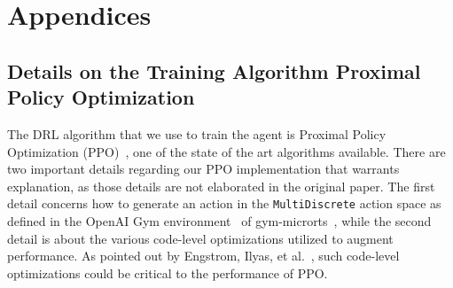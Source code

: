 \documentclass[letterpaper]{article}
\begin{document}

\fontsize{9.5pt}{10.5pt}
\selectfont



\clearpage
\onecolumn


\appendix
\section*{Appendices}
\renewcommand{\thesubsection}{\Alph{subsection}}


\subsection{Details on the Training Algorithm Proximal Policy Optimization}
\label{sec:details_on_ppo}
The DRL algorithm that we use to train the agent is Proximal Policy Optimization (PPO)~\cite{schulman2017proximal}, one of the state of the art algorithms available. There are two important  details regarding our PPO implementation that warrants explanation, as those details are not elaborated in the original paper. The first detail concerns how to generate an action in the \texttt{MultiDiscrete}  action space as defined in the OpenAI Gym environment~\cite{brockman2016openai} of gym-microrts~\cite{huang2019comparing}, while the second detail is about the various code-level optimizations utilized to augment performance. As pointed out by Engstrom, Ilyas, et al.~\cite{engstrom2019implementation}, such code-level optimizations could be critical to the performance of PPO.
\end{document}
